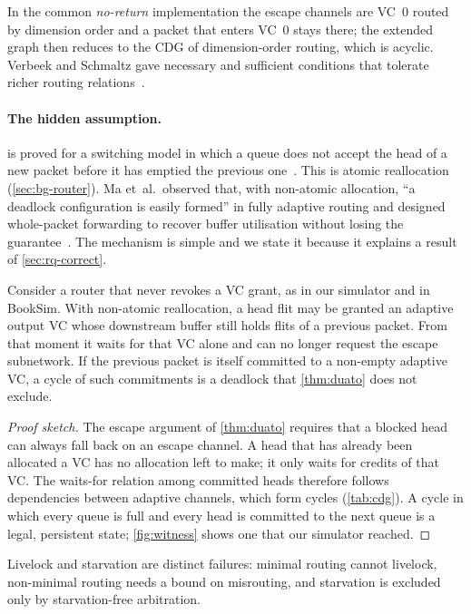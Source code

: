 In the common \emph{no-return} implementation the escape channels are VC~0 routed by dimension order and a packet that enters VC~0 stays there; the extended graph then reduces to the CDG of dimension-order routing, which is acyclic. Verbeek and Schmaltz gave necessary and sufficient conditions that tolerate richer routing relations~\cite{verbeek2011necessary}.

\paragraph{The hidden assumption.}  is proved for a switching model in which a queue does not accept the head of a new packet before it has emptied the previous one~\cite{duato1993theory}. This is atomic reallocation (\cref{sec:bg-router}). Ma et~al.\ observed that, with non-atomic allocation, ``a deadlock configuration is easily formed'' in fully adaptive routing and designed whole-packet forwarding to recover buffer utilisation without losing the guarantee~\cite{ma2012wpf}. The mechanism is simple and we state it because it explains a result of \cref{sec:rq-correct}.

\begin{proposition}\label{prop:nonatomic}
Consider a router that never revokes a VC grant, as in our simulator and in BookSim. With non-atomic reallocation, a head flit may be granted an adaptive output VC whose downstream buffer still holds flits of a previous packet. From that moment it waits for that VC alone and can no longer request the escape subnetwork. If the previous packet is itself committed to a non-empty adaptive VC, a cycle of such commitments is a deadlock that \cref{thm:duato} does not exclude.
\end{proposition}

\begin{proof}[Proof sketch]
The escape argument of \cref{thm:duato} requires that a blocked head can always fall back on an escape channel. A head that has already been allocated a VC has no allocation left to make; it only waits for credits of that VC. The waits-for relation among committed heads therefore follows dependencies between adaptive channels, which form cycles (\cref{tab:cdg}). A cycle in which every queue is full and every head is committed to the next queue is a legal, persistent state; \cref{fig:witness} shows one that our simulator reached.
\end{proof}

Livelock and starvation are distinct failures: minimal routing cannot livelock, non-minimal routing needs a bound on misrouting, and starvation is excluded only by starvation-free arbitration.

